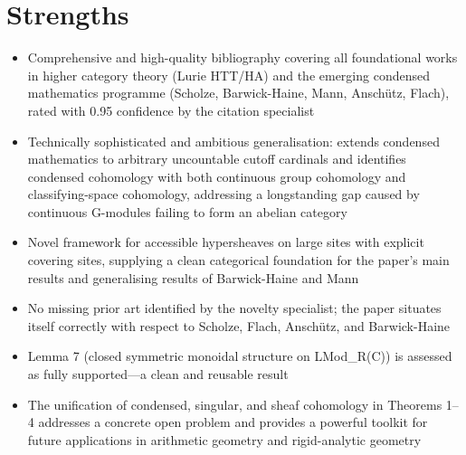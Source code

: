 \documentclass[11pt]{article}
\begin{document}
\section*{Strengths}
\begin{itemize}[leftmargin=*]
  \item Comprehensive and high-quality bibliography covering all foundational works in higher category theory (Lurie HTT/HA) and the emerging condensed mathematics programme (Scholze, Barwick-Haine, Mann, Anschütz, Flach), rated with 0.95 confidence by the citation specialist
  \item Technically sophisticated and ambitious generalisation: extends condensed mathematics to arbitrary uncountable cutoff cardinals and identifies condensed cohomology with both continuous group cohomology and classifying-space cohomology, addressing a longstanding gap caused by continuous G-modules failing to form an abelian category
  \item Novel framework for accessible hypersheaves on large sites with explicit covering sites, supplying a clean categorical foundation for the paper's main results and generalising results of Barwick-Haine and Mann
  \item No missing prior art identified by the novelty specialist; the paper situates itself correctly with respect to Scholze, Flach, Anschütz, and Barwick-Haine
  \item Lemma 7 (closed symmetric monoidal structure on LMod\_R(C)) is assessed as fully supported—a clean and reusable result
  \item The unification of condensed, singular, and sheaf cohomology in Theorems 1–4 addresses a concrete open problem and provides a powerful toolkit for future applications in arithmetic geometry and rigid-analytic geometry
\end{itemize}
\end{document}
